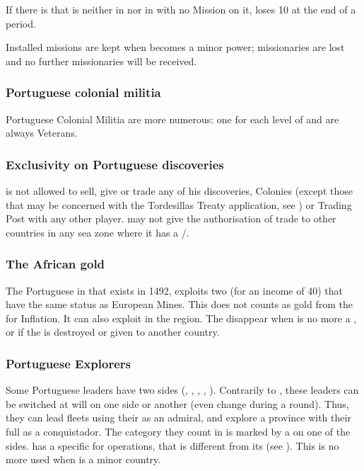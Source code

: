 \aparag If there is \COL that is neither in  nor in
 with no Mission on it, \POR loses 10 \PV at
the end of a period.

\aparag Installed missions are kept when  becomes a minor
power; missionaries are lost and no further missionaries will be
received.


\subsubsection{Portuguese colonial militia}
\aparag Portuguese Colonial Militia are more numerous: one \LDE for each
level of \COL and are always Veterans.

\subsubsection{Exclusivity on Portuguese discoveries}
\aparag \POR is not allowed to sell, give or trade any of his
discoveries, Colonies (except those that may be concerned with the
Tordesillas Treaty application, see ) or
Trading Post with any other player.
 \POR may not give the authorisation of trade
to other countries in any sea zone where it has a \COL/\TP.

\subsubsection{The African gold}\label{chSpecific:Portugal:African Gold}
 The Portuguese \TP
{} in  that exists in 1492,
exploits two  (for an income of 40\ducats) that have the
same status as European Mines. This does not counts as gold from the
\ROTW for Inflation. It can also exploit  in the region. The
 disappear when \POR is no more a \MAJ, or if the \TP is
destroyed or given to another country.

\subsubsection{Portuguese Explorers}
\aparag Some Portuguese leaders have two sides (,
, , ,
).
\bparag\label{chSpecific:Portugal:Explorers} Contrarily to
, these leaders can be switched
at will on one side or another (even change during a round). Thus, they
can lead fleets using their \Man as an admiral, and explore a province
with their full \Man as a conquistador.
\bparag The category they count in is marked by a {\textetoile} on one
of the sides.
 \POR has a specific \FTI for \ROTW
operations, that is different from its \FTI (see
).
\bparag This \FTI is no more used when \POR is a minor country.


